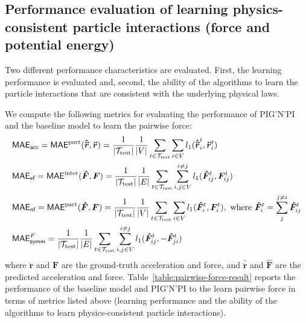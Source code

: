 \documentclass{article}
\newcommand{\pignpi}{PIG'N'PI\xspace}
\begin{document}
\clearpage

\subsection{Performance evaluation of learning physics-consistent particle interactions (force and potential energy)}
\label{sec:force-potential-test-results}
Two different performance characteristics are evaluated. First, the learning performance is evaluated and, second, the ability of the algorithms to learn the particle interactions that are consistent with the underlying physical laws. 

We compute the following metrics for evaluating the performance of \pignpi and the baseline model to learn the pairwise force:
\begin{align}
&\textsf{MAE\textsubscript{acc}}= \textsf{MAE}^{\mathrm{part}}(\bm{\hat{\ddot{r}}},\bm{\ddot{r}}) =  \frac{1}{|\mathcal{T}_{\text{test}}|} \frac{1}{|V|}  \sum_{t\in \mathcal{T}_{\text{test}}}\sum_{i\in V} l_1(\bm{\hat{\ddot{r}}}_{i}^t, \bm{\ddot{r}}_{i}^t)
 \\
&\textsf{MAE\textsubscript{ef}} = \textsf{MAE}^{\mathrm{inter}}(\bm{\hat{F}},\bm{F}) = \frac{1}{|\mathcal{T}_{\text{test}}|} \frac{1}{|E|}  \sum_{t\in \mathcal{T}_{\text{test}}}\sum_{i,j \in V}^{i\neq j} l_1(\bm{\hat{F}}_{ij}^t, \bm{F}_{ij}^t)\\
&\textsf{MAE\textsubscript{nf}}= \textsf{MAE}^{\mathrm{part}}(\bm{\hat{F}}, \bm{F}) = \frac{1}{|\mathcal{T}_{\text{test}}|} \frac{1}{|V|}  \sum_{t\in \mathcal{T}_{\text{test}}}\sum_{i\in V} l_1(\bm{\hat{F}}_{i}^t, \bm{F}_{i}^t), \text{ where } \bm{\hat{F}}_{i}^t = \sum_j^{j\neq i}\bm{\hat{F}}_{ij}^t\\
&\textsf{MAE}_\textsf{symm}^{F} = \frac{1}{|\mathcal{T}_{\text{test}}|} \frac{1}{|E|}  \sum_{t\in \mathcal{T}_{\text{test}}}\sum_{i,j\in V}^{i\neq j} l_1(\bm{\hat{F}}_{ij}^t, - \bm{\hat{F}}_{ji}^t)
\end{align}
where $\bm{\ddot{r}}$ and $\bm{F}$ are the ground-truth acceleration and force, and $\bm{\hat{\ddot{r}}}$ and $\bm{\hat{F}}$ are the predicted  acceleration and force. 
Table~\ref{table:pairwise-force-result} reports the performance of the baseline model and \pignpi to the learn pairwise force in terms of metrics listed above (learning performance and the ability of the algorithms to learn physics-consistent particle interactions). 
\end{document}
